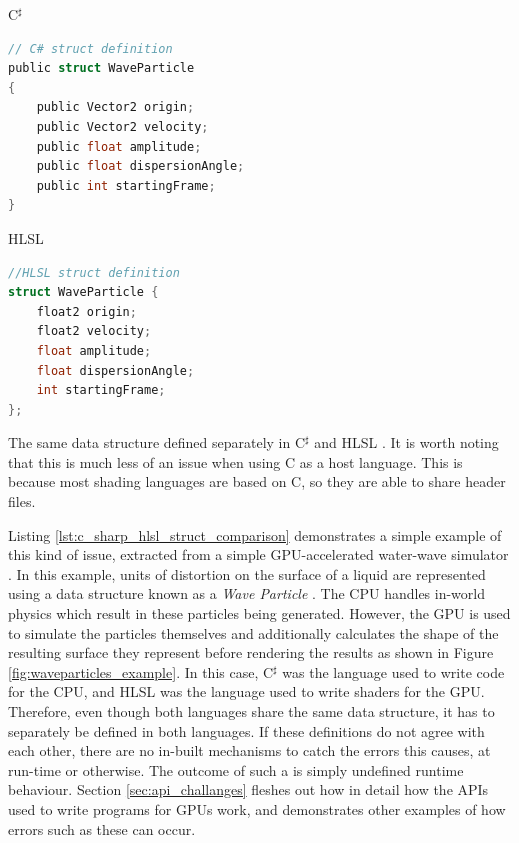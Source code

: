 \documentclass[a4paper,12pt,twoside,openright]{report}
\begin{document}
\begin{lstfloat}
\begin{center} C$^\sharp$ \end{center}
\begin{lstlisting}[language=C]
// C# struct definition
public struct WaveParticle
{
    public Vector2 origin;
    public Vector2 velocity;
    public float amplitude;
    public float dispersionAngle;
    public int startingFrame;
}
\end{lstlisting}
\begin{center} HLSL \end{center}
\begin{lstlisting}[language=C]
//HLSL struct definition
struct WaveParticle {
    float2 origin;
    float2 velocity;
    float amplitude;
    float dispersionAngle;
    int startingFrame;
};
\end{lstlisting}
\caption{The same data structure defined separately in C$^\sharp$ and HLSL
\cite{WaveParticlesGPU}. It is worth noting that this is much less of an issue
when using C as a host language. This is because most shading languages are
based on C, so they are able to share header files.}
\label{lst:c_sharp_hlsl_struct_comparison}
\end{lstfloat}

Listing \ref{lst:c_sharp_hlsl_struct_comparison} demonstrates a simple example
of this kind of issue, extracted from a simple GPU-accelerated water-wave
simulator \cite{WaveParticlesGPU}. In this example, units of distortion on the
surface of a liquid are represented using a data structure known as a
\textit{Wave Particle} \cite{WaveParticlesOriginalPaper}. The CPU handles
in-world physics which result in these particles being generated. However, the
GPU is used to simulate the particles themselves and additionally calculates
the shape of the resulting surface they represent before rendering the results
as shown in Figure \ref{fig:waveparticles_example}. In this case, C$^\sharp$
was the language used to write code for the CPU, and HLSL was the language used
to write shaders for the GPU. Therefore, even though both languages share the
same data structure, it has to separately be defined in both languages. If
these definitions do not agree with each other, there are no in-built
mechanisms to catch the errors this causes, at run-time or otherwise. The
outcome of such a is simply undefined runtime behaviour. Section
\ref{sec:api_challanges} fleshes out how in detail how the APIs used to write
programs for GPUs work, and demonstrates other examples of how errors such as
these can occur.
\end{document}
